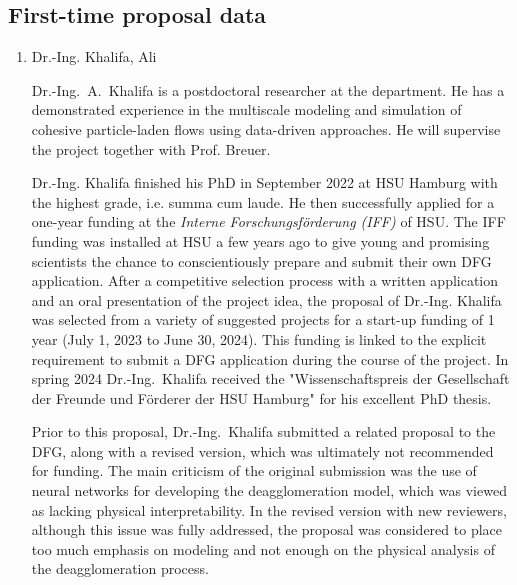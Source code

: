 \documentclass[11pt,a4paper,twoside]{scrartcl}
\begin{document}
\clearpage
\subsection{First-time proposal data}
\begin{enumerate}
\item[] Dr.-Ing. Khalifa, Ali

\medskip

 Dr.-Ing.\ A.\ Khalifa is a postdoctoral researcher at the
 department. He has a demonstrated experience in the multiscale
 modeling and simulation of cohesive particle-laden flows using
 data-driven approaches. He will supervise the project together with 
 Prof. Breuer.

Dr.-Ing. Khalifa finished his PhD in September 2022 at HSU Hamburg
with the highest grade, i.e. summa cum laude.  He then successfully
applied for a one-year funding at the \textit{Interne
  Forschungsförderung (IFF)} of HSU.  The IFF funding was installed at
HSU a few years ago to give young and promising scientists the chance
to conscientiously prepare and submit their own DFG application. After
a competitive selection process with a written application and an oral
presentation of the project idea, the proposal of Dr.-Ing. Khalifa was
selected from a variety of suggested projects for a start-up funding
of 1 year (July 1, 2023 to June 30, 2024). This funding is linked to
the explicit requirement to submit a DFG application during the course
of the project. In spring 2024 Dr.-Ing.\ Khalifa received the
"Wissenschaftspreis der Gesellschaft der Freunde und Förderer der HSU
Hamburg" for his excellent PhD thesis.


Prior to this proposal, Dr.-Ing.\ Khalifa submitted a related proposal
to the DFG, along with a revised version, which was ultimately not
recommended for funding. The main criticism of the original submission
was the use of neural networks for developing the deagglomeration
model, which was viewed as lacking physical interpretability. In the
revised version with new reviewers, although this issue was fully addressed, the
proposal was considered to place too much emphasis on modeling
and not enough on the physical analysis of the deagglomeration
process.


\end{enumerate}
\end{document}
